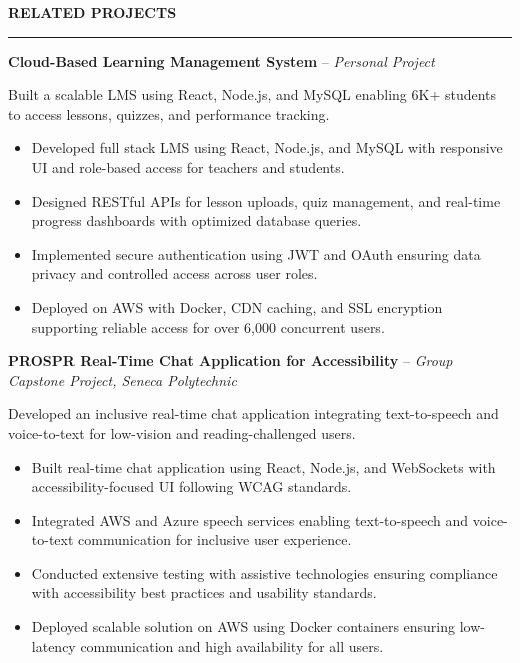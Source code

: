 \documentclass[10pt,letterpaper]{article}
\begin{document}
\vspace{6pt}

\textbf{RELATED PROJECTS}\\[-8pt]
\noindent\rule{\textwidth}{1pt}

\vspace{-2pt}

\textbf{Cloud-Based Learning Management System} -- \emph{Personal Project}

\vspace{-1pt}

Built a scalable LMS using React, Node.js, and MySQL enabling 6K+ students to access lessons, quizzes, and performance tracking.
\vspace{-1pt}
\begin{itemize}
\item Developed full stack LMS using React, Node.js, and MySQL with responsive UI and role-based access for teachers and students.
\item Designed RESTful APIs for lesson uploads, quiz management, and real-time progress dashboards with optimized database queries.
\item Implemented secure authentication using JWT and OAuth ensuring data privacy and controlled access across user roles.
\item Deployed on AWS with Docker, CDN caching, and SSL encryption supporting reliable access for over 6,000 concurrent users.
\end{itemize}

\textbf{PROSPR  Real-Time Chat Application for Accessibility} -- \emph{Group Capstone Project, Seneca Polytechnic}

\vspace{-1pt}

Developed an inclusive real-time chat application integrating text-to-speech and voice-to-text for low-vision and reading-challenged users.
\vspace{-1pt}
\begin{itemize}
\item Built real-time chat application using React, Node.js, and WebSockets with accessibility-focused UI following WCAG standards.
\item Integrated AWS and Azure speech services enabling text-to-speech and voice-to-text communication for inclusive user experience.
\item Conducted extensive testing with assistive technologies ensuring compliance with accessibility best practices and usability standards.
\item Deployed scalable solution on AWS using Docker containers ensuring low-latency communication and high availability for all users.
\end{itemize}
\end{document}

